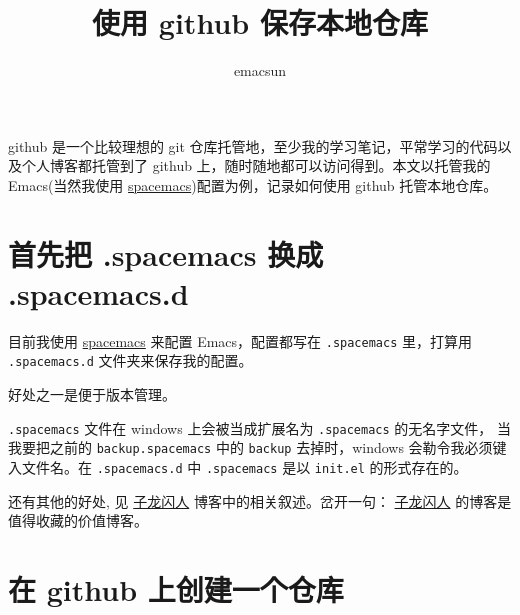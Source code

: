 \documentclass[10pt,a4paper,UTF8]{article}
\author{emacsun}
\date{}
\title{使用 github 保存本地仓库}
\begin{document}
\maketitle
\tableofcontents
{}
github 是一个比较理想的 git 仓库托管地，至少我的学习笔记，平常学习的代码以及个人博客都托管到了 github 上，随时随地都可以访问得到。本文以托管我的 Emacs(当然我使用 \href{https://spacemacs.org}{spacemacs})配置为例，记录如何使用 github 托管本地仓库。



\section{首先把 .spacemacs 换成 .spacemacs.d}
\label{sec:org9d4cb68}


目前我使用 \href{http://spacemacs.org/}{spacemacs} 来配置 Emacs，配置都写在 \texttt{.spacemacs} 里，打算用 \texttt{.spacemacs.d} 文件夹来保存我的配置。

好处之一是便于版本管理。

\texttt{.spacemacs} 文件在 windows 上会被当成扩展名为 \texttt{.spacemacs} 的无名字文件， 当我要把之前的 \texttt{backup.spacemacs} 中的 \texttt{backup} 去掉时，windows 会勒令我必须键入文件名。在 \texttt{.spacemacs.d} 中 \texttt{.spacemacs} 是以 \texttt{init.el} 的形式存在的。

还有其他的好处, 见 \href{https://zilongshanren.com/}{子龙闪人} 博客中的相关叙述。岔开一句： \href{https://zilongshanren.com/}{子龙闪人}  的博客是值得收藏的价值博客。
\section{在 github 上创建一个仓库}
\label{sec:org9d1958b}
\end{document}
